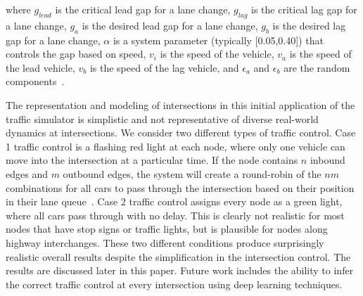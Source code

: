 \documentclass[final]{IEEEtran}
\begin{document}
where $g_{lead}$ is the critical lead gap for a lane change, $g_{lag}$ is
the critical lag gap for a lane change, $g_a$ is the desired lead gap for a lane change, $g_b$ is the desired lag gap for a lane change, $\alpha$ is a system parameter (typically [0.05,0.40]) that controls the gap based on speed, $v_i$ is the speed of the vehicle, $v_a$ is the speed of the lead vehicle, $v_b$ is the speed of the lag vehicle, and $\epsilon_a$ and $\epsilon_b$ are the random components~\cite{garcia-doradoDesigningLargescaleInteractive2014}.

The representation and modeling of intersections in this initial application of the traffic simulator is simplistic and not representative of diverse real-world dynamics at intersections. We consider two different types of traffic control. Case 1 traffic control is a flashing red light at each node, where only one vehicle can move into the intersection at a particular time. If the node contains $n$ inbound edges and $m$ outbound edges, the system will create a round-robin of the $nm$ combinations for all cars to pass through the intersection based on their position in their lane queue~\cite{waddellIntegratedPipelineArchitecture2018}. Case 2 traffic control assigns every node as a green light, where all cars pass through with no delay. This is clearly not realistic for most nodes that have stop signs or traffic lights, but is plausible for nodes along highway interchanges. These two different conditions produce surprisingly realistic overall results despite the simplification in the intersection control. The results are discussed later in this paper. Future work includes the ability to infer the correct traffic control at every intersection using deep learning techniques.

\end{document}
